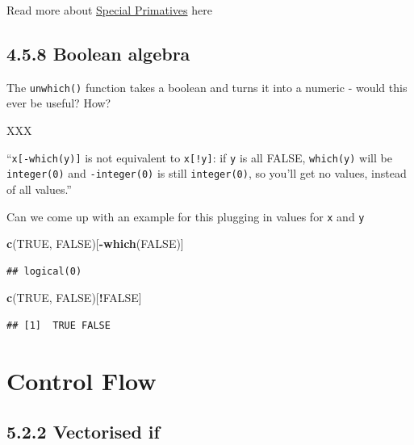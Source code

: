 \documentclass[]{book}
\newenvironment{Shaded}{\begin{snugshade}}{\end{snugshade}}
\newcommand{\KeywordTok}[1]{\textcolor[rgb]{0.13,0.29,0.53}{\textbf{#1}}}
\newcommand{\NormalTok}[1]{#1}
\newcommand{\OperatorTok}[1]{\textcolor[rgb]{0.81,0.36,0.00}{\textbf{#1}}}
\newcommand{\OtherTok}[1]{\textcolor[rgb]{0.56,0.35,0.01}{#1}}
\begin{document}
Read more about \href{https://cran.r-project.org/doc/manuals/r-release/R-ints.html\#Special-primitives}{Special Primatives} here

\hypertarget{boolean-algebra}{%
\section*{4.5.8 Boolean algebra}\label{boolean-algebra}}

The \texttt{unwhich()} function takes a boolean and turns it into a numeric - would this ever be useful? How?

XXX

``\texttt{x{[}-which(y){]}} is not equivalent to \texttt{x{[}!y{]}}: if \texttt{y} is all FALSE, \texttt{which(y)} will be \texttt{integer(0)} and \texttt{-integer(0)} is still \texttt{integer(0)}, so you'll get no values, instead of all values.''

Can we come up with an example for this plugging in values for \texttt{x} and \texttt{y}

\begin{Shaded}
\begin{Highlighting}[]
\KeywordTok{c}\NormalTok{(}\OtherTok{TRUE}\NormalTok{, }\OtherTok{FALSE}\NormalTok{)[}\OperatorTok{-}\KeywordTok{which}\NormalTok{(}\OtherTok{FALSE}\NormalTok{)]}
\end{Highlighting}
\end{Shaded}

\begin{verbatim}
## logical(0)
\end{verbatim}

\begin{Shaded}
\begin{Highlighting}[]
\KeywordTok{c}\NormalTok{(}\OtherTok{TRUE}\NormalTok{, }\OtherTok{FALSE}\NormalTok{)[}\OperatorTok{!}\OtherTok{FALSE}\NormalTok{]}
\end{Highlighting}
\end{Shaded}

\begin{verbatim}
## [1]  TRUE FALSE
\end{verbatim}

\hypertarget{control-flow}{%
\chapter{Control Flow}\label{control-flow}}

\hypertarget{vectorised-if}{%
\section*{5.2.2 Vectorised if}\label{vectorised-if}}
\end{document}
